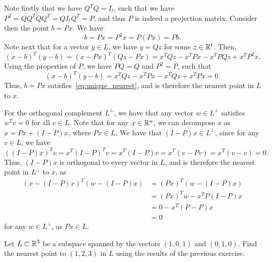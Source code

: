 \begin{solution}
  Note firstly that we have $Q^T Q = I_t$, such that we have $P^2 = Q Q^T Q Q^T = Q I_t Q^T = P$, and thus $P$ is indeed a projection matrix.
  Consider then the point $b = Px$.
  We have
  \begin{equation}
    b = Px = P^2 x = P (Px) = P b.
  \end{equation}
  Note next that for a vector $y \in L$, we have $y = Q z$ for some $z \in \mathbb{R}^t$.
  Then,
  \begin{equation}
    (x - b)^T (y - b) = (x - Px)^T (Q z - Px) = x^T Q z - x^T P x - x^T P Q z + x^T P^2 x.
  \end{equation}
  Using the properties of $P$, we have $P Q = Q$ and $P^2 = P$, such that
  \begin{equation}
    (x - b)^T (y - b) = x^T Q z - x^T P x - x^T Q z + x^T P x = 0.
  \end{equation}
  Thus, $b = Px$ satisfies~\eqref{eq:unique_nearest}, and is therefore the nearest point in $L$ to $x$.

  For the orthogonal complement $L^\perp$, we have that any vector $w \in L^\perp$ satisfies $w^T v = 0$ for all $v \in L$.
  Note that for any $x \in \mathbb{R}^n$, we can decompose $x$ as $x = Px + (I - P)x$, where $Px \in L$.
  We have that $(I - P)x \in L^\perp$, since for any $v \in L$, we have
  \begin{equation}
    ((I - P)x)^T v = x^T (I - P)^T v = x^T (I - P) v = x^T (v - Pv) = x^T (v - v) = 0.
  \end{equation}
  Thus, $(I - P)x$ is orthogonal to every vector in $L$, and is therefore the nearest point in $L^\perp$ to $x$, as
  \begin{equation}
    \begin{split}
      (x - (I - P)x)^T (w - (I - P)x) &= (Px)^T (w - (I - P)x) \\
      &= (Px)^T w - x^T P (I - P)x \\
      &= 0 - x^T (P - P)x \\
      &= 0
    \end{split}
  \end{equation}
  for any $w \in L^\perp$, as $Px \in L$.
\end{solution}

\begin{exercise}
  Let $L \subset \mathbb{R}^3$ be a subspace spanned by the vectors $(1, 0, 1)$ and $(0, 1, 0)$.
  Find the nearest point to $(1, 2, 3)$ in $L$ using the results of the previous exercise.
\end{exercise}

